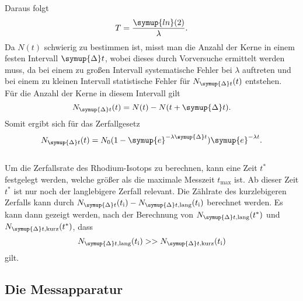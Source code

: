     Daraus folgt
    \begin{equation}
        T = \frac{\symup{ln}(2)}{\lambda} . \label{eqn:Halbwertszeit}
    \end{equation}
    Da $N(t)$ schwierig zu bestimmen ist,
    misst man die Anzahl der Kerne in einem festen Intervall $\symup{\Delta}t$,
    wobei dieses durch Vorversuche ermittelt werden muss,
    da bei einem zu großen Intervall systematische Fehler bei $\lambda$ auftreten 
    und bei einem zu kleinen Intervall statistische Fehler für $N_{\symup{\Delta}t}(t)$ entstehen.\\
    Für die Anzahl der Kerne in diesem Intervall gilt 
    \begin{equation}
        N_{\symup{\Delta}t}(t) = N(t) - N(t + \symup{\Delta} t) .
    \end{equation}
    Somit ergibt sich für das Zerfallgesetz
    \begin{equation}
        N_{\symup{\Delta}t}(t) = N_0 (1 - \symup{e}^{-\lambda \symup{\Delta}t}) \symup{e}^{-\lambda t} .
    \end{equation} 
    \\
    Um die Zerfallsrate des Rhodium-Isotops zu berechnen,
    kann eine Zeit $t^*$ festgelegt werden,
    welche größer als die maximale Messzeit $t_\text{max}$ ist.
    Ab dieser Zeit $t^*$ ist nur noch der langlebigere Zerfall relevant.
    Die Zählrate des kurzlebigeren Zerfalls kann durch $N_{\symup{\Delta}t} (t_\text{i}) - N_{\symup{\Delta}t, \text{lang}} (t_\text{i})$ berechnet werden.
    Es kann dann gezeigt werden, 
    nach der Berechnung von $N_{\symup{\Delta}t, \text{lang}} (t^*)$ und $N_{\symup{\Delta}t, \text{kurz}} (t^*)$,
    dass 
    \begin{equation}
        N_{\symup{\Delta}t, \text{lang}} (t_\text{i}) >> N_{\symup{\Delta}t, \text{kurz}} (t_\text{i})
    \end{equation}
    gilt.

\subsection{Die Messapparatur}


